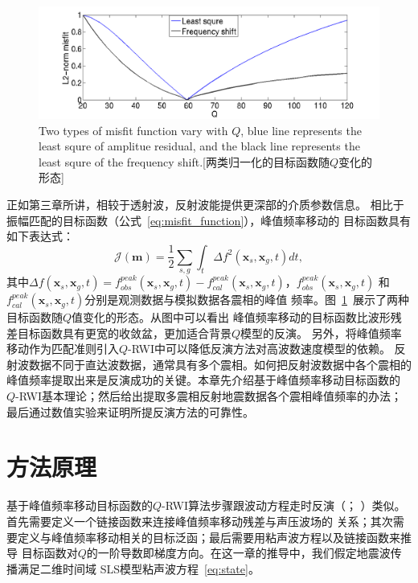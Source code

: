\begin{figure}[!htbp]
    \centering
    {\includegraphics[width=0.92\linewidth]{figure/misfit_com}}
	{Two types of misfit function vary with $Q$, blue line represents the least 
	squre of amplitue residual, and the black line represents the least squre of 
	the frequency shift.}[两类归一化的目标函数随$Q$变化的形态]
    \label{fig:misfit_com}
\end{figure}
正如第三章所讲，相较于透射波，反射波能提供更深部的介质参数信息。
相比于振幅匹配的目标函数（公式~\ref{eq:misfit_function}），峰值频率移动的
目标函数具有如下表达式：
\begin{equation}
    \mathcal{J}(\mathbf{m})=\frac{1}{2}\sum_{s,g}\int_t\Delta f^2(\mathbf{x}_s,\mathbf{x}_g,t)dt,
    \label{eq:freq_misfit_function}
\end{equation}
其中$\Delta f(\mathbf{x}_s,\mathbf{x}_g,t)=f^{peak}_{obs}(\mathbf{x}_s,\mathbf{x}_g,t)-
f^{peak}_{cal}(\mathbf{x}_s,\mathbf{x}_g,t)$，$f^{peak}_{obs}(\mathbf{x}_s,\mathbf{x}_g,t)$
和$f^{peak}_{cal}(\mathbf{x}_s,\mathbf{x}_g,t)$分别是观测数据与模拟数据各震相的峰值
频率。图~\ref{fig:misfit_com}~展示了两种目标函数随$Q$值变化的形态。从图中可以看出
峰值频率移动的目标函数比波形残差目标函数具有更宽的收敛盆，更加适合背景$Q$模型的反演。
另外，将峰值频率移动作为匹配准则引入$Q$-RWI中可以降低反演方法对高波数速度模型的依赖。
反射波数据不同于直达波数据，通常具有多个震相。如何把反射波数据中各个震相的
峰值频率提取出来是反演成功的关键。本章先介绍基于峰值频率移动目标函数的
$Q$-RWI基本理论；然后给出提取多震相反射地震数据各个震相峰值频率的办法；
最后通过数值实验来证明所提反演方法的可靠性。

\vspace{1.5cm}
\section{方法原理}

基于峰值频率移动目标函数的$Q$-RWI算法步骤跟波动方程走时反演（；
）类似。首先需要定义一个链接函数来连接峰值频率移动残差与声压波场的
关系；其次需要定义与峰值频率移动相关的目标泛函；最后需要用粘声波方程以及链接函数来推导
目标函数对$Q$的一阶导数即梯度方向。在这一章的推导中，我们假定地震波传播满足二维时间域
SLS模型粘声波方程~\ref{eq:state}。

